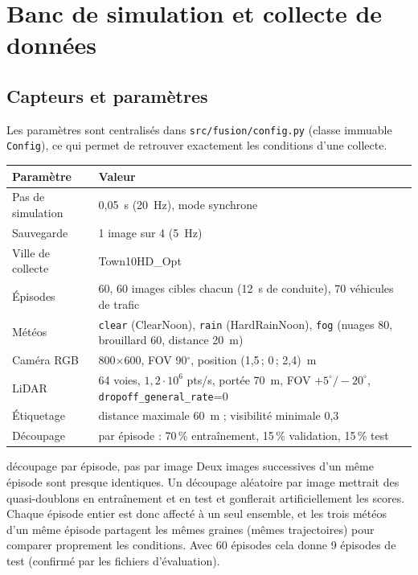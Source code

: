 \documentclass[11pt,a4paper]{article}
\newcommand{\code}[1]{\texttt{#1}}
\begin{document}
\section{Banc de simulation et collecte de donn\'ees}
\subsection{Capteurs et param\`etres}
Les param\`etres sont centralis\'es dans \code{src/fusion/config.py} (classe immuable \code{Config}), ce qui permet de
retrouver exactement les conditions d'une collecte.
\begin{center}\begin{tabular}{@{}p{3.6cm}p{11.4cm}@{}}\toprule
Param\`etre & Valeur \\\midrule
Pas de simulation & 0,05~s (20~Hz), mode synchrone \\
Sauvegarde & 1 image sur 4 (5~Hz) \\
Ville de collecte & Town10HD\_Opt \\
\'Episodes & 60, 60 images cibles chacun (12~s de conduite), 70 v\'ehicules de trafic \\
M\'et\'eos & \code{clear} (ClearNoon), \code{rain} (HardRainNoon), \code{fog} (nuages 80, brouillard 60, distance 20~m) \\
Cam\'era RGB & 800$\times$600, FOV 90$^\circ$, position (1,5\,; 0\,; 2,4)~m \\
LiDAR & 64 voies, $1{,}2\cdot10^6$ pts/s, port\'ee 70~m, FOV $+5^\circ/-20^\circ$, \code{dropoff\_general\_rate}=0 \\
\'Etiquetage & distance maximale 60~m ; visibilit\'e minimale 0,3 \\
D\'ecoupage & par \'episode : 70\,\% entra\^inement, 15\,\% validation, 15\,\% test \\
\bottomrule\end{tabular}\end{center}

\begin{choix}{d\'ecoupage par \'episode, pas par image}
Deux images successives d'un m\^eme \'episode sont presque identiques. Un d\'ecoupage al\'eatoire par image mettrait des quasi-doublons
en entra\^inement et en test et gonflerait artificiellement les scores. Chaque \'episode entier est donc affect\'e \`a un seul ensemble,
et les trois m\'et\'eos d'un m\^eme \'episode partagent les m\^emes graines (m\^emes trajectoires) pour comparer proprement les conditions.
Avec 60 \'episodes cela donne 9 \'episodes de test (confirm\'e par les fichiers d'\'evaluation).
\end{choix}
\end{document}
